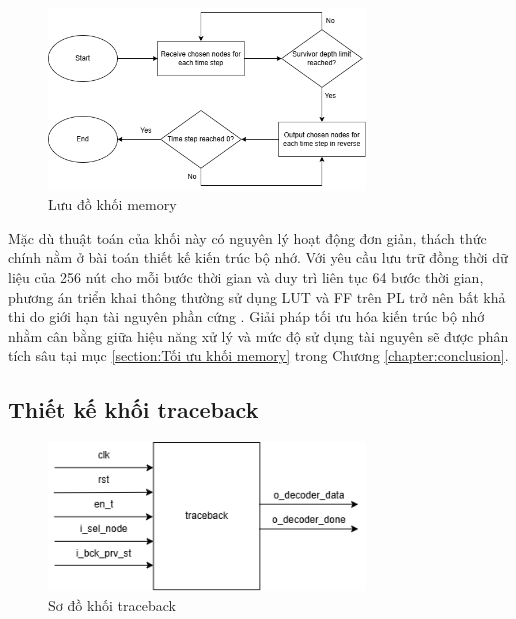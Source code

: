 \documentclass[../DoAn.tex]{subfiles}
\begin{document}
\begin{figure}[H]
    \centering
    \includegraphics[width=0.75\textwidth, height=0.2\textheight, keepaspectratio]{Hinhve/Chuong 4/memory flow chart.png}
    \caption{Lưu đồ khối memory}
    \label{fig:Lưu đồ khối memory}
\end{figure}

Mặc dù thuật toán của khối này có nguyên lý hoạt động đơn giản, thách thức chính nằm ở bài toán thiết kế kiến trúc bộ nhớ. Với yêu cầu lưu trữ đồng thời dữ liệu của 256 nút cho mỗi bước thời gian và duy trì liên tục 64 bước thời gian, phương án triển khai thông thường sử dụng LUT và FF trên PL trở nên bất khả thi do giới hạn tài nguyên phần cứng \cite{noauthor_aup_nodate}. Giải pháp tối ưu hóa kiến trúc bộ nhớ nhằm cân bằng giữa hiệu năng xử lý và mức độ sử dụng tài nguyên sẽ được phân tích sâu tại mục \ref{section:Tối ưu khối memory} trong Chương \ref{chapter:conclusion}.

\subsection{Thiết kế khối traceback}

\begin{figure}[H]
    \centering
    \includegraphics[width=0.75\textwidth, height=0.14\textheight, keepaspectratio]{Hinhve/Chuong 4/traceback.png}
    \caption{Sơ đồ khối traceback}
\end{figure}
\end{document}
